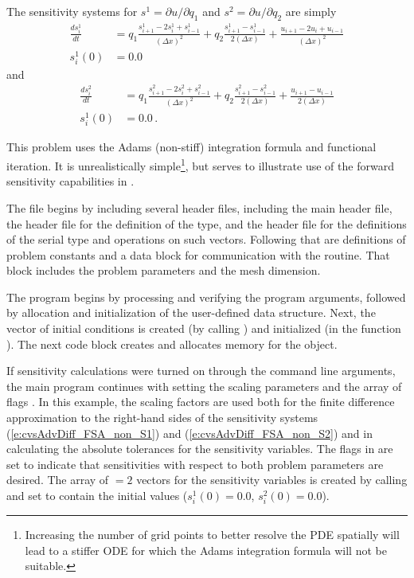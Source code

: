 The sensitivity systems for $s^1 = \partial u / \partial q_1$ and
$s^2 = \partial u / \partial q_2$ are simply
\begin{equation}\label{e:cvsAdvDiff_FSA_non_S1}
  \begin{split}
    \frac{d s^1_i}{dt} 
    &= q_1 \frac{s^1_{i+1}-2s^1_{i}+s^1_{i-1}}{(\Delta x)^{2}}
    + q_2 \frac{s^1_{i+1}-s^1_{i-1}}{2(\Delta x)} 
    + \frac{u_{i+1}-2u_{i}+u_{i-1}}{(\Delta x)^{2}} \\
    s^1_i (0) &= 0.0 
  \end{split}
\end{equation}
and
\begin{equation}\label{e:cvsAdvDiff_FSA_non_S2}
  \begin{split}
    \frac{d s^2_i}{dt} 
    &= q_1 \frac{s^2_{i+1}-2s^2_{i}+s^2_{i-1}}{(\Delta x)^{2}}
    + q_2 \frac{s^2_{i+1}-s^2_{i-1}}{2(\Delta x)} 
    + \frac{u_{i+1}-u_{i-1}}{2(\Delta x)} \\
    s^1_i (0) &= 0.0  \, .
  \end{split}
\end{equation}

This problem uses the Adams (non-stiff) integration formula and functional iteration.
It is unrealistically simple\footnote{Increasing the number of grid points to better
resolve the PDE spatially will lead to a stiffer ODE for which the Adams integration
formula will not be suitable.},
but serves to illustrate use of the forward sensitivity capabilities in {\cvodes}.

The  file begins by including several header files, including 
the main {\cvodes} header file, the  header file for the
definition of the  type, and the {\nvecs} header file 
for the definitions of the serial  type and operations on such vectors.
Following that are definitions of problem constants and a data block for communication
with the  routine.  That block includes the problem parameters and the mesh 
dimension.

The  program begins by processing and verifying the program arguments,
followed by allocation and initialization of the user-defined data structure. Next, the
vector of initial conditions is created (by calling ) and
initialized (in the function ). The next code block creates and allocates
memory for the {\cvodes} object. 

If sensitivity calculations were turned on through the command line arguments,
the main program continues with setting the scaling parameters
 and the array of flags . In this example,
the scaling factors  are used both for the finite difference approximation
to the right-hand sides of the sensitivity systems (\ref{e:cvsAdvDiff_FSA_non_S1}) 
and (\ref{e:cvsAdvDiff_FSA_non_S2}) and in calculating the absolute tolerances for the 
sensitivity variables. 
The flags in  are set to indicate that sensitivities with respect to both 
problem parameters are desired.
The array of  $=2$ vectors  for the sensitivity variables is created
by calling  and set to contain the initial values
($s^1_i(0) = 0.0$, $s^2_i(0) = 0.0$).

